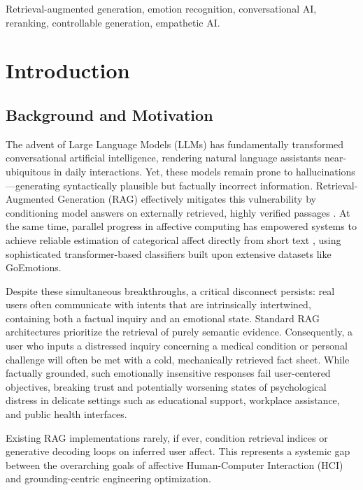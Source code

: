 \documentclass[conference]{IEEEtran}
\begin{document}
\begin{IEEEkeywords}
Retrieval-augmented generation, emotion recognition, conversational AI, reranking, controllable generation, empathetic AI.
\end{IEEEkeywords}

\section{Introduction}

\subsection{Background and Motivation}
The advent of Large Language Models (LLMs) has fundamentally transformed conversational artificial intelligence, rendering natural language assistants near-ubiquitous in daily interactions. Yet, these models remain prone to hallucinations---generating syntactically plausible but factually incorrect information. Retrieval-Augmented Generation (RAG) effectively mitigates this vulnerability by conditioning model answers on externally retrieved, highly verified passages \cite{1}. At the same time, parallel progress in affective computing has empowered systems to achieve reliable estimation of categorical affect directly from short text \cite{2}, using sophisticated transformer-based classifiers built upon extensive datasets like GoEmotions. 

Despite these simultaneous breakthroughs, a critical disconnect persists: real users often communicate with intents that are intrinsically intertwined, containing both a factual inquiry and an emotional state. Standard RAG architectures prioritize the retrieval of purely semantic evidence. Consequently, a user who inputs a distressed inquiry concerning a medical condition or personal challenge will often be met with a cold, mechanically retrieved fact sheet. While factually grounded, such emotionally insensitive responses fail user-centered objectives, breaking trust and potentially worsening states of psychological distress in delicate settings such as educational support, workplace assistance, and public health interfaces.

Existing RAG implementations rarely, if ever, condition retrieval indices or generative decoding loops on inferred user affect. This represents a systemic gap between the overarching goals of affective Human-Computer Interaction (HCI) and grounding-centric engineering optimization. 
\end{document}
